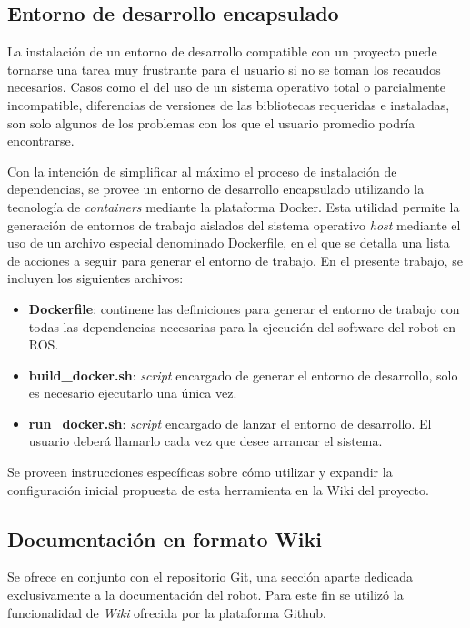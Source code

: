 \subsection{Entorno de desarrollo encapsulado}

La instalación de un entorno de desarrollo compatible con un proyecto puede tornarse una tarea muy frustrante para el usuario si no se toman los recaudos necesarios. Casos como el del uso de un sistema operativo total o parcialmente incompatible, diferencias de versiones de las bibliotecas requeridas e instaladas, son solo algunos de los problemas con los que el usuario promedio podría encontrarse.

Con la intención de simplificar al máximo el proceso de instalación de dependencias, se provee un entorno de desarrollo encapsulado utilizando la tecnología de \textit{containers} mediante la plataforma Docker\protect\footnotemark. Esta utilidad permite la generación de entornos de trabajo aislados del sistema operativo \textit{host} mediante el uso de un archivo especial denominado Dockerfile, en el que se detalla una lista de acciones a seguir para generar el entorno de trabajo. En el presente trabajo, se incluyen los siguientes archivos:

\begin{itemize}
  \item \textbf{Dockerfile}: continene las definiciones para generar el entorno de trabajo con todas las dependencias necesarias para la ejecución del software del robot en ROS.
  \item \textbf{build\_docker.sh}: \textit{script} encargado de generar el entorno de desarrollo, solo es necesario ejecutarlo una única vez.
  \item \textbf{run\_docker.sh}: \textit{script} encargado de lanzar el entorno de desarrollo. El usuario deberá llamarlo cada vez que desee arrancar el sistema.
\end{itemize}


Se proveen instrucciones específicas sobre cómo utilizar y expandir la configuración inicial propuesta de esta herramienta en la Wiki del proyecto.

\subsection{Documentación en formato Wiki}

Se ofrece en conjunto con el repositorio Git\protect\footnotemark, una sección aparte dedicada exclusivamente a la documentación del robot. Para este fin se utilizó la funcionalidad de \textit{Wiki} ofrecida por la plataforma Github.

